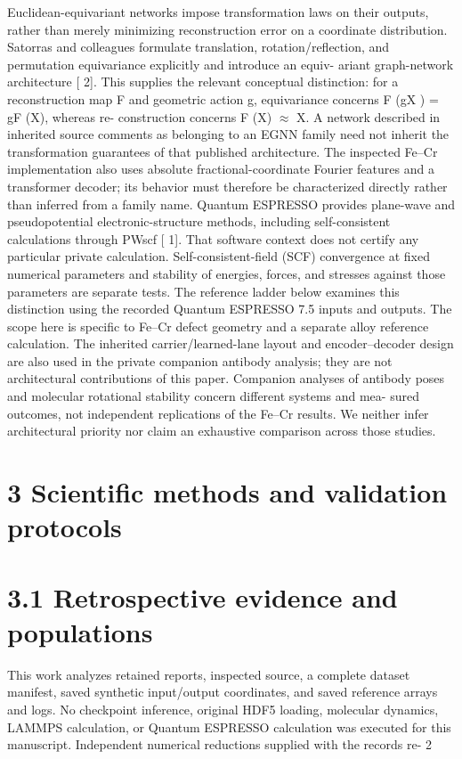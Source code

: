 \documentclass[11pt]{article}
\begin{document}
Euclidean-equivariant networks impose transformation laws on their outputs, rather than merely
minimizing reconstruction error on a coordinate distribution. Satorras and colleagues formulate
translation, rotation/reflection, and permutation equivariance explicitly and introduce an equiv-
ariant graph-network architecture [ 2]. This supplies the relevant conceptual distinction: for a
reconstruction map F and geometric action g, equivariance concerns F (gX ) = gF (X), whereas re-
construction concerns F (X) \ensuremath{\approx} X. A network described in inherited source comments as belonging
to an EGNN family need not inherit the transformation guarantees of that published architecture.
The inspected Fe–Cr implementation also uses absolute fractional-coordinate Fourier features and
a transformer decoder; its behavior must therefore be characterized directly rather than inferred
from a family name.
Quantum ESPRESSO provides plane-wave and pseudopotential electronic-structure methods,
including self-consistent calculations through PWscf [ 1]. That software context does not certify any
particular private calculation. Self-consistent-field (SCF) convergence at fixed numerical parameters
and stability of energies, forces, and stresses against those parameters are separate tests. The
reference ladder below examines this distinction using the recorded Quantum ESPRESSO 7.5 inputs
and outputs.
The scope here is specific to Fe–Cr defect geometry and a separate alloy reference calculation.
The inherited carrier/learned-lane layout and encoder–decoder design are also used in the private
companion antibody analysis; they are not architectural contributions of this paper. Companion
analyses of antibody poses and molecular rotational stability concern different systems and mea-
sured outcomes, not independent replications of the Fe–Cr results. We neither infer architectural
priority nor claim an exhaustive comparison across those studies.

\section*{3 Scientific methods and validation protocols}


\section*{3.1 Retrospective evidence and populations}

This work analyzes retained reports, inspected source, a complete dataset manifest, saved synthetic
input/output coordinates, and saved reference arrays and logs. No checkpoint inference, original
HDF5 loading, molecular dynamics, LAMMPS calculation, or Quantum ESPRESSO calculation
was executed for this manuscript. Independent numerical reductions supplied with the records re-
2
\end{document}
